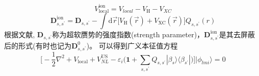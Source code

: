 	$$V_{\mathrm{local}}^{\mathrm{ion}}=V_{local}-V_{\mathrm H}-V_{XC}$$
	\begin{equation}
		\mathbf{D}_{s,s^{\prime}}^{\mathrm{ion}}=\mathbf{D}_{s,s^{\prime}}-\int\mathrm{d}\vec r\big[V_{\mathrm{H}}(\vec r)+V_{\mathrm{XC}}(\vec r)\big]Q_{s,s^{\prime}}(r)
		\label{eq:uspp_6}
	\end{equation}
根据文献, $\mathbf{D}_{s,s^{\prime}}$称为超软赝势的强度指数(\textrm{strength parameter})，$\mathbf{D}_{s,s^{\prime}}^{\mathrm{ion}}$是其去屏蔽后的形式(有时也记为$\mathbf{D}_{s,s^{\prime}}^0$)。
可以得到广义本征值方程
\begin{equation}
	\bigg[-\dfrac12\nabla^2+V_{\mathrm{local}}+V_{NL}^{\mathrm{US}}-\varepsilon_i\bigg(\mathbf{1}+\sum_{s,s^{\prime}}Q_{s,s^{\prime}}|\beta_s\rangle\langle\beta_{s^{\prime}}|\bigg)\bigg]|\phi_{lmi}\rangle=0
	\label{eq:uspp_7}
\end{equation}
